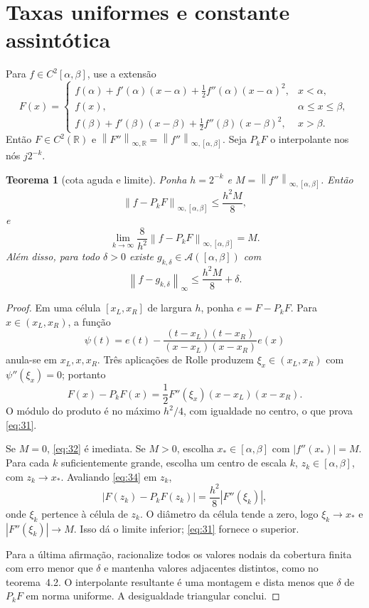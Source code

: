 \documentclass[11pt,a4paper]{article}
\theoremstyle{preciso}
\newtheorem{teorema}{Teorema}[section]
\theoremstyle{definition}
\newcommand{\R}{\mathbb R}
\newcommand{\Asm}{\mathcal A}
\newcommand{\norm}[1]{\left\|#1\right\|_{\infty}}
\newcommand{\normK}[2]{\left\|#1\right\|_{\infty,#2}}
\newcommand{\eqn}[2]{\begin{equation}\label{eq:#1}#2\end{equation}}
\begin{document}
\setcounter{equation}{29}
\section{Taxas uniformes e constante assintótica}
Para $f\in C^2[\alpha,\beta]$, use a extensão
\eqn{30}{F(x)=\begin{cases}
f(\alpha)+f'(\alpha)(x-\alpha)+\frac12f''(\alpha)(x-\alpha)^2,&x<\alpha,\\
f(x),&\alpha\le x\le\beta,\\
f(\beta)+f'(\beta)(x-\beta)+\frac12f''(\beta)(x-\beta)^2,&x>\beta.
\end{cases}}
Então $F\in C^2(\R)$ e $\normK{F''}{\R}=\normK{f''}{[\alpha,\beta]}$. Seja $P_kF$ o interpolante nos nós $j2^{-k}$.

\begin{teorema}[cota aguda e limite]
Ponha $h=2^{-k}$ e $M=\normK{f''}{[\alpha,\beta]}$. Então
\eqn{31}{\normK{f-P_kF}{[\alpha,\beta]}\le\frac{h^2M}8,}
e
\eqn{32}{\lim_{k\to\infty}\frac8{h^2}\normK{f-P_kF}{[\alpha,\beta]}=M.}
Além disso, para todo $\delta>0$ existe $g_{k,\delta}\in\Asm([\alpha,\beta])$ com
\eqn{33}{\norm{f-g_{k,\delta}}\le\frac{h^2M}8+\delta.}
\end{teorema}
\begin{proof}
Em uma célula $[x_L,x_R]$ de largura $h$, ponha $e=F-P_kF$. Para $x\in(x_L,x_R)$, a função
\[
\psi(t)=e(t)-\frac{(t-x_L)(t-x_R)}{(x-x_L)(x-x_R)}e(x)
\]
anula-se em $x_L,x,x_R$. Três aplicações de Rolle produzem $\xi_x\in(x_L,x_R)$ com $\psi''(\xi_x)=0$; portanto
\eqn{34}{F(x)-P_kF(x)=\frac12F''(\xi_x)(x-x_L)(x-x_R).}
O módulo do produto é no máximo $h^2/4$, com igualdade no centro, o que prova \eqref{eq:31}.

Se $M=0$, \eqref{eq:32} é imediata. Se $M>0$, escolha $x_*\in[\alpha,\beta]$ com $|f''(x_*)|=M$. Para cada $k$ suficientemente grande, escolha um centro de escala $k$, $z_k\in[\alpha,\beta]$, com $z_k\to x_*$. Avaliando \eqref{eq:34} em $z_k$,
\[
|F(z_k)-P_kF(z_k)|=\frac{h^2}8|F''(\xi_k)|,
\]
onde $\xi_k$ pertence à célula de $z_k$. O diâmetro da célula tende a zero, logo $\xi_k\to x_*$ e $|F''(\xi_k)|\to M$. Isso dá o limite inferior; \eqref{eq:31} fornece o superior.

Para a última afirmação, racionalize todos os valores nodais da cobertura finita com erro menor que $\delta$ e mantenha valores adjacentes distintos, como no teorema~4.2. O interpolante resultante é uma montagem e dista menos que $\delta$ de $P_kF$ em norma uniforme. A desigualdade triangular conclui.
\end{proof}
\end{document}
